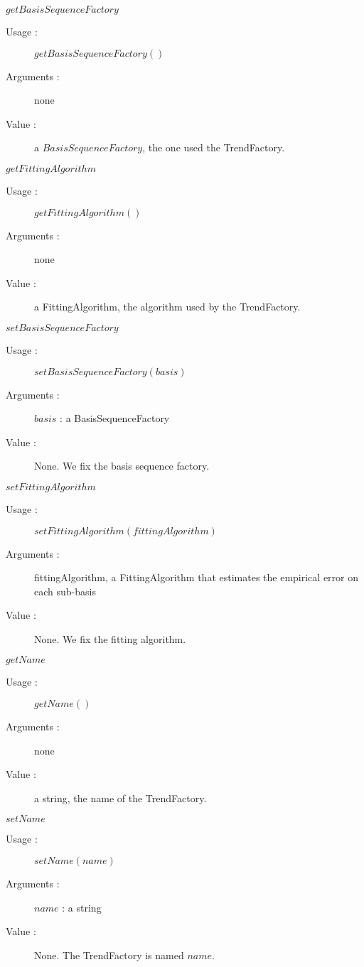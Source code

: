 \begin{description}
\begin{description}
  \item $getBasisSequenceFactory$
    \begin{description}
    \item[Usage :] $getBasisSequenceFactory()$
    \item[Arguments :] none
    \item[Value :] a $BasisSequenceFactory$, the one used the TrendFactory.
    \end{description}
    \bigskip

  \item $getFittingAlgorithm$
    \begin{description}
    \item[Usage :] $getFittingAlgorithm()$
    \item[Arguments :] none
    \item[Value :] a FittingAlgorithm, the algorithm used by the TrendFactory.
    \end{description}
    \bigskip

  \item $setBasisSequenceFactory$
    \begin{description}
    \item[Usage :] $setBasisSequenceFactory(basis)$
    \item[Arguments :]  $basis$ : a BasisSequenceFactory
    \item[Value :] None. We fix the basis sequence factory.
    \end{description}
    \bigskip

  \item $setFittingAlgorithm$
    \begin{description}
    \item[Usage :] $setFittingAlgorithm(fittingAlgorithm)$
    \item[Arguments :] fittingAlgorithm, a FittingAlgorithm that estimates the empirical error on each sub-basis 
    \item[Value :] None. We fix the fitting algorithm.
    \end{description}
    \bigskip

  \item $getName$
    \begin{description}
    \item[Usage :] $getName()$
    \item[Arguments :] none
    \item[Value :] a string, the name of the TrendFactory.
    \end{description}
    \bigskip

  \item $setName$
    \begin{description}
    \item[Usage :] $setName(name)$
    \item[Arguments :] $name$ : a string
    \item[Value :] None. The TrendFactory is named $name$.
    \end{description}
    \bigskip


  \end{description}

\end{description}


